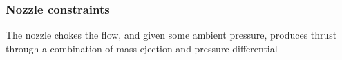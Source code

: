 \subsubsection{Nozzle constraints}

The nozzle chokes the flow, and given some ambient pressure,
produces thrust through a combination of mass ejection and
pressure differential







%

